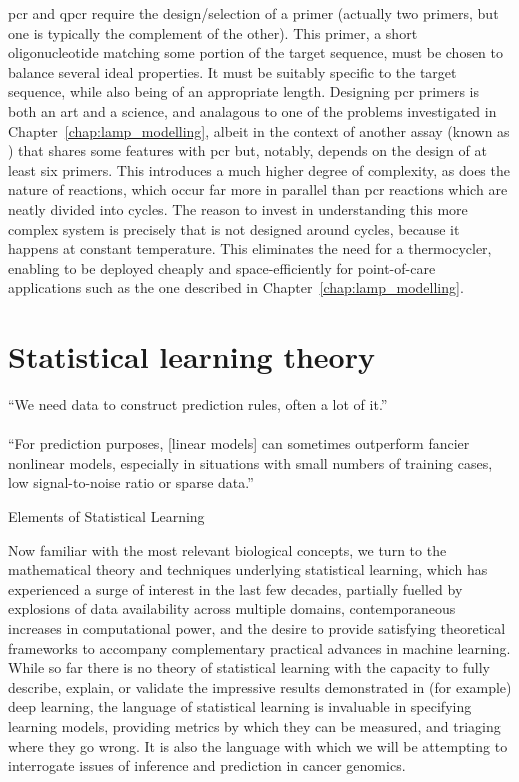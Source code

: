 \documentclass[thesis.tex]{subfiles}
\begin{document}
\Gls{pcr} and \gls{qpcr} require the design/selection of a primer (actually two primers, but one is typically the complement of the other). This primer, a short oligonucleotide matching some portion of the target sequence, must be chosen to balance several ideal properties. It must be suitably specific to the target  sequence, while also being of an appropriate length. Designing \gls{pcr} primers is both an art and a science, and analagous to one of the problems investigated in Chapter~\ref{chap:lamp_modelling}, albeit in the context of another assay (known as ) that shares some features with \gls{pcr} but, notably, depends on the design of at least six primers. This introduces a much higher degree of complexity, as does the nature of  reactions, which occur far more in parallel than \gls{pcr} reactions which are neatly divided into cycles. The reason to invest in understanding this more complex system is precisely that  is not designed around cycles, because it happens at constant temperature. This eliminates the need for a thermocycler, enabling  to be deployed cheaply and space-efficiently for point-of-care applications such as the one described in Chapter~\ref{chap:lamp_modelling}.

\section{Statistical learning theory} \label{sec:statistical_learning}
\epigraph{``We need data to construct prediction rules, often a lot of it.'' \\
~\\
``For prediction purposes, [linear models] can sometimes outperform fancier
nonlinear models, especially in situations with small numbers of training
cases, low signal-to-noise ratio or sparse data.''}{Elements of Statistical Learning \\
\citep{hastie_elements_2009}}

Now familiar with the most relevant biological concepts, we turn to the mathematical theory and techniques underlying statistical learning, which has experienced a surge of interest in the last few decades, partially fuelled by explosions of data availability across multiple domains, contemporaneous increases in computational power, and the desire to provide satisfying theoretical frameworks to accompany complementary practical advances in machine learning. While so far there is no theory of statistical learning with the capacity to fully describe, explain, or validate the impressive results demonstrated in (for example) deep learning, the language of statistical learning is invaluable in specifying learning models, providing metrics by which they can be measured, and triaging where they go wrong. It is also the language with which we will be attempting to interrogate issues of inference and prediction in cancer genomics. 
\end{document}

